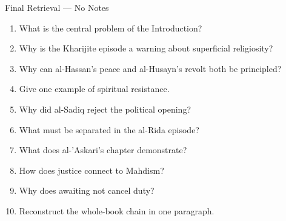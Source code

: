 \documentclass[11pt,aspectratio=169]{beamer}
\begin{document}
\begin{frame}{Final Retrieval — No Notes}
\small
\begin{enumerate}
\item What is the central problem of the Introduction?
\item Why is the Kharijite episode a warning about superficial religiosity?
\item Why can al-Hassan's peace and al-Husayn's revolt both be principled?
\item Give one example of spiritual resistance.
\item Why did al-Sadiq reject the political opening?
\item What must be separated in the al-Rida episode?
\item What does al-'Askari's chapter demonstrate?
\item How does justice connect to Mahdism?
\item Why does awaiting not cancel duty?
\item Reconstruct the whole-book chain in one paragraph.
\end{enumerate}
\end{frame}
\end{document}
